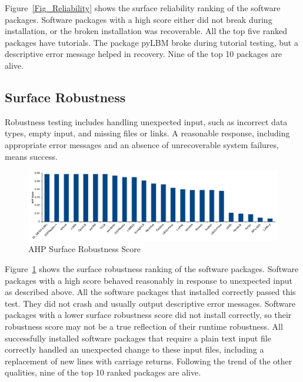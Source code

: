 \documentclass[final, 3p, times, authoryear]{elsarticle}
\begin{document}
Figure~\ref{Fig_Reliability} shows the surface reliability ranking of the
software packages. Software packages with a high score either did not break
during installation, or the broken installation was recoverable. All the top
five ranked packages have tutorials. The package pyLBM broke during tutorial
testing, but a descriptive error message helped in recovery. Nine of the top 10
packages are alive. 

\subsection{Surface Robustness}

Robustness testing includes handling unexpected input, such as incorrect data
types, empty input, and missing files or links. A reasonable response, including
appropriate error messages and an absence of unrecoverable system failures,
means success. 

\begin{figure}[h!]
	\begin{center}
		\includegraphics[width=1.0\textwidth]{./figures/robustness_chart.pdf}
		\caption{AHP Surface Robustness Score}
		\label{Fig_Robustness}
	\end{center}
\end{figure}

Figure~\ref{Fig_Robustness} shows the surface robustness ranking of the software
packages. Software packages with a high score behaved reasonably in response to
unexpected input as described above. All the software packages that installed
correctly passed this test. They did not crash and usually output descriptive
error messages. Software packages with a lower surface robustness score did not
install correctly, so their robustness score may not be a true reflection of
their runtime robustness. All successfully installed software packages that
require a plain text input file correctly handled an unexpected change to these
input files, including a replacement of new lines with carriage returns.
Following the trend of the other qualities, nine of the top 10 ranked packages
are alive.
\end{document}
